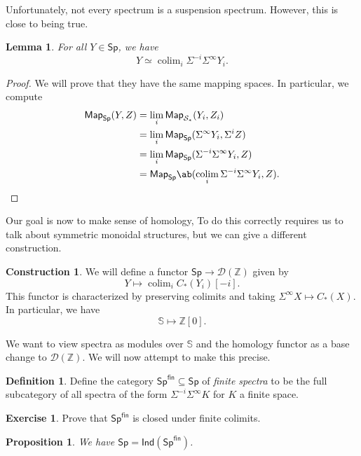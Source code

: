\documentclass[10pt, oneside]{memoir}
\newtheorem{prop}[thm]{Proposition}
\newtheorem{lem}[thm]{Lemma}
\theoremstyle{definition}
\newtheorem{defn}[thm]{Definition}
\newtheorem{con}[thm]{Construction}
\newtheorem{exer}[thm]{Exercise}
\theoremstyle{remark}
\theoremstyle{plain}
\theoremstyle{definition}
\theoremstyle{remark}
\newcommand{\Z}{\mathbb{Z}}
\newcommand{\bS}{\mathbb{S}}
\newcommand{\mc}[1]{\mathcal{#1}}
\newcommand{\ms}[1]{\mathsf{#1}}
\newcommand{\1}{\mathbf{1}}
\newcommand{\2}{\mathbf{2}}
\newcommand{\3}{\mathbf{3}}
\DeclareMathOperator*{\colim}{colim}
\begin{document}
Unfortunately, not every spectrum is a suspension spectrum. However, this is close to being true.
\begin{lem}
    For all \(Y \in \ms{Sp} \), we have
    \[ Y \simeq \colim_i \Sigma^{-i} \Sigma^{\infty} Y_i. \]
\end{lem}

\begin{proof}
    We will prove that they have the same mapping spaces. In particular, we compute
    \begin{align*}
        \ms{Map}_{\ms{Sp}}(Y, Z) &= \lim_i \ms{Map}_{\mc{S}_*}(Y_i, Z_i) \\
        &= \lim_i \ms{Map}_{\ms{Sp}} (\Sigma^{\infty} Y_i, \Sigma^i Z) \\
        &= \lim_i \ms{Map}_{\ms{Sp}} (\Sigma^{-i} \Sigma^{\infty} Y_i, Z) \\
        &= \ms{Map}_{\ms{Sp}} \ab(\colim_i \Sigma^{-i}\Sigma^{\infty} Y_i, Z).
    \end{align*}
\end{proof}

Our goal is now to make sense of homology, To do this correctly requires us to talk about symmetric monoidal structures, but we can give a different construction.

\begin{con}
    We will define a functor \(\ms{Sp} \to \mc{D}(\Z) \) given by
    \[ Y \mapsto \colim_i C_*(Y_i) [-i]. \]
    This functor is characterized by preserving colimits and taking \(\Sigma^{\infty} X \mapsto C_*(X) \). In particular, we have
    \[ \bS \mapsto \Z[0]. \]
\end{con}

We want to view spectra as modules over \(\bS \) and the homology functor as a base change to \(\mc{D}(\Z) \). We will now attempt to make this precise.

\begin{defn}
    Define the category \(\ms{Sp}^{\ms{fin}} \subseteq \ms{Sp} \) of \textit{finite spectra} to be the full subcategory of all spectra of the form \(\Sigma^{-i} \Sigma^{\infty} K \) for \(K \) a finite space.
\end{defn}

\begin{exer}
    Prove that \(\ms{Sp}^{\ms{fin}} \) is closed under finite colimits.
\end{exer}

\begin{prop}
    We have \(\ms{Sp} = \ms{Ind}(\ms{Sp}^{\ms{fin}}) \).
\end{prop}
\end{document}
